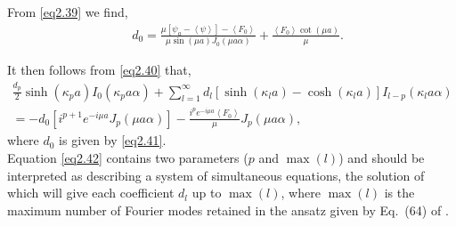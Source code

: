 \documentclass[aip,graphicx]{revtex4-1}
\newcommand{\lr}[1]{\left(#1\right)}
\newcommand{\lrsq}[1]{\left[ #1 \right]}
\newcommand{\lra}[1]{\left\langle #1 \right\rangle}
\newcommand{\besj}[2]{J_{#1}\lr{#2}}
\newcommand{\besi}[2]{I_{#1}\lr{#2}}
\begin{document}
From \eqref{eq2.39} we find,
    \begin{align}
    \quad d_0=\frac{\mu\lrsq{\psi_a-\lra{\psi}}-\lra{F_0}}{\mu \sin\lr{\mu a}\besj{0}{\mu a \alpha}}+ \frac{\lra{F_0}\cot\lr{\mu a}}{\mu}.\label{eq2.41}  
    \end{align}
    
It then follows from \eqref{eq2.40} that,
    \begin{multline}
        \frac{d_p}{2}\sinh\lr{\kappa_p a}\besi{0}{\kappa_p a \alpha}+\sum_{l=1}^{\infty}d_l\lrsq{\sinh\lr{\kappa_l a}-\cosh\lr{\kappa_l a}}\besi{l-p}{\kappa_l a \alpha}\\
        = -d_0\left[i^{p+1}e^{-i\mu a}\besj{p}{\mu a \alpha}\right]-\frac{i^p e^{-i\mu a}\lra{F_0}}{\mu}\besj{p}{\mu a \alpha},\label{eq2.42}
    \end{multline}
        where $d_0$ is given by \eqref{eq2.41}.\\
        
{\color{blue} Equation \eqref{eq2.42} contains two parameters ($p$ and $\max\lr{l}$) and should be interpreted as describing a system of simultaneous equations, the solution of which will give each coefficient $d_l$ up to $\max\lr{l}$, where $\max\lr{l}$ is the maximum number of Fourier modes retained in the ansatz given by Eq.\ (64) of \citet{dewar2017}.}




\end{document}
